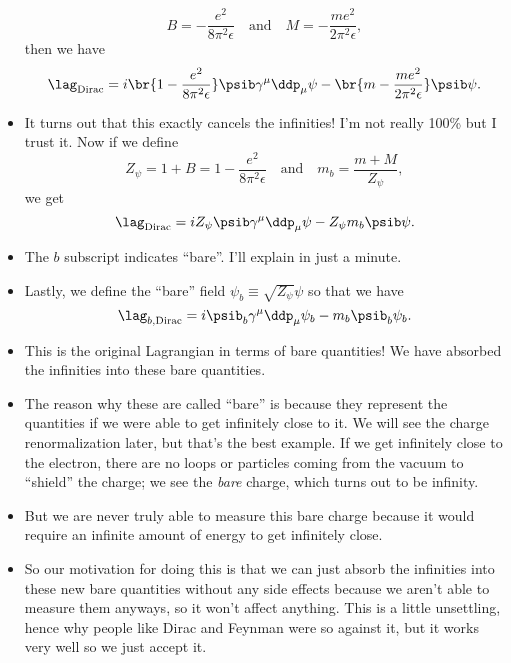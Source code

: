 \begin{itemize}
\begin{equation}
            B = -\frac{e^2}{8\pi^2\epsilon} \quad\mathrm{and}\quad M = -\frac{me^2}{2\pi^2\epsilon},
        \end{equation}
        then we have
        \begin{equation}
            \lag_{\mathrm{Dirac}} = i\br{1 - \frac{e^2}{8\pi^2\epsilon}}\psib \gamma^{\mu}\ddp_{\mu}\psi - \br{m - \frac{me^2}{2\pi^2\epsilon}}\psib\psi.
        \end{equation}
    \item It turns out that this exactly cancels the infinities! I'm not really 100\% but I trust it. Now if we define
        \begin{equation}
            Z_{\psi} = 1+B = 1 - \frac{e^2}{8\pi^2\epsilon} \quad\mathrm{and}\quad m_b = \frac{m+M}{Z_{\psi}},
        \end{equation}
        we get
        \begin{equation}
            \lag_{\mathrm{Dirac}} = iZ_{\psi} \psib \gamma^{\mu}\ddp_{\mu} \psi - Z_{\psi}m_b\psib\psi.
        \end{equation}
    \item The $b$ subscript indicates ``bare''. I'll explain in just a minute.
    \item Lastly, we define the ``bare'' field $\psi_b \equiv \sqrt{Z_{\psi}}\psi$ so that we have
        \begin{equation}
            \lag_{b,\mathrm{Dirac}} = i\psib_b \gamma^{\mu}\ddp_{\mu} \psi_b - m_b \psib_b\psi_b.
        \end{equation}
    \item This is the original Lagrangian in terms of bare quantities! We have absorbed the infinities into these bare quantities.
    \item The reason why these are called ``bare'' is because they represent the quantities if we were able to get infinitely close to it. We will see the charge renormalization later, but that's the best example. If we get infinitely close to the electron, there are no loops or particles coming from the vacuum to ``shield'' the charge; we see the \textit{bare} charge, which turns out to be infinity.
    \item But we are never truly able to measure this bare charge because it would require an infinite amount of energy to get infinitely close.
    \item So our motivation for doing this is that we can just absorb the infinities into these new bare quantities without any side effects because we aren't able to measure them anyways, so it won't affect anything. This is a little unsettling, hence why people like Dirac and Feynman were so against it, but it works very well so we just accept it.
\end{itemize}







